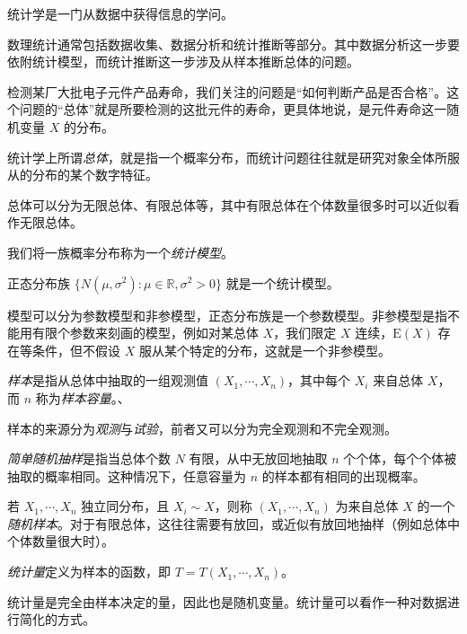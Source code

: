 \documentclass[../main.tex]{subfiles}
\begin{document}
统计学是一门从数据中获得信息的学问。

数理统计通常包括数据收集、数据分析和统计推断等部分。其中数据分析这一步要依附统计模型，而统计推断这一步涉及从样本推断总体的问题。

\begin{example}
    检测某厂大批电子元件产品寿命，我们关注的问题是“如何判断产品是否合格”。这个问题的“总体”就是所要检测的这批元件的寿命，更具体地说，是元件寿命这一随机变量 $X$ 的分布。
\end{example}

统计学上所谓\emph{总体}，就是指一个概率分布，而统计问题往往就是研究对象全体所服从的分布的某个数字特征。

总体可以分为无限总体、有限总体等，其中有限总体在个体数量很多时可以近似看作无限总体。


我们将一族概率分布称为一个\emph{统计模型}。

\begin{example}
    正态分布族 $\{N(\mu,\sigma^2):\mu\in\mathbb R,\sigma^2>0\}$ 就是一个统计模型。
\end{example}

模型可以分为参数模型和非参模型，正态分布族是一个参数模型。非参模型是指不能用有限个参数来刻画的模型，例如对某总体 $X$，我们限定 $X$ 连续，$\mathrm E(X)$ 存在等条件，但不假设 $X$ 服从某个特定的分布，这就是一个非参模型。

\emph{样本}是指从总体中抽取的一组观测值 $(X_1,\cdots,X_n)$，其中每个 $X_i$ 来自总体 $X$，而 $n$ 称为\emph{样本容量}。、

样本的来源分为\emph{观测}与\emph{试验}，前者又可以分为完全观测和不完全观测。


\emph{简单随机抽样}是指当总体个数 $N$ 有限，从中无放回地抽取 $n$ 个个体，每个个体被抽取的概率相同。这种情况下，任意容量为 $n$ 的样本都有相同的出现概率。

若 $X_1,\cdots,X_n$ 独立同分布，且 $X_i\sim X$，则称 $(X_1,\cdots,X_n)$ 为来自总体 $X$ 的一个\emph{随机样本}。对于有限总体，这往往需要有放回，或近似有放回地抽样（例如总体中个体数量很大时）。

\begin{definition}\label{def:6.0.1}
    \emph{统计量}定义为样本的函数，即 $T=T(X_1,\cdots,X_n)$。
\end{definition}

统计量是完全由样本决定的量，因此也是随机变量。统计量可以看作一种对数据进行简化的方式。
\end{document}
